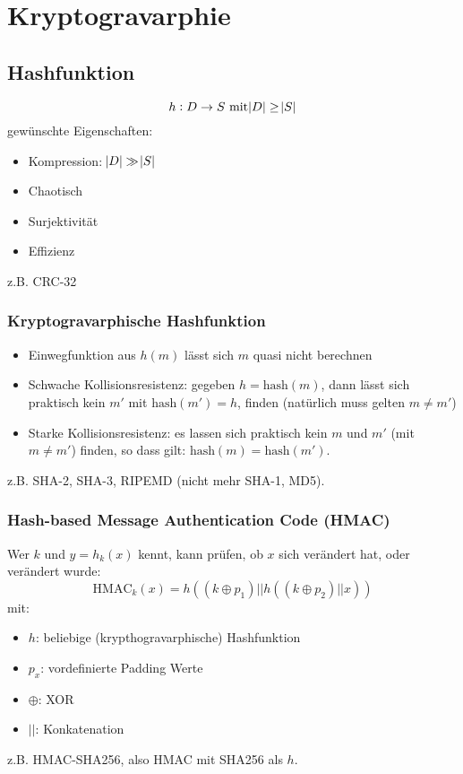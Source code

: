 \chapter{Kryptogravarphie}
\section{Hashfunktion}
\begin{equation*}
    h: D \to S \text{ mit} \abs{D} \geq \abs{S}
\end{equation*}
gewünschte Eigenschaften:
\begin{itemize}
    \item Kompression: $\abs{D} \gg \abs{S}$
    \item Chaotisch
    \item Surjektivität
    \item Effizienz
\end{itemize}
z.B. CRC-32

\subsection{Kryptogravarphische Hashfunktion}
\begin{itemize}
    \item Einwegfunktion aus $h(m)$ lässt sich $m$ quasi nicht berechnen
    \item Schwache Kollisionsresistenz: gegeben $h = \text{hash}(m)$, 
        dann lässt sich praktisch kein $m'$ mit $\text{hash}(m') = h$,
        finden (natürlich muss gelten $m \neq m'$)
    \item Starke Kollisionsresistenz: es lassen sich praktisch kein
        $m$ und $m'$ (mit $m \neq m'$) finden, so dass gilt:
        $\text{hash}(m) = \text{hash}(m')$.
\end{itemize}
z.B. SHA-2, SHA-3, RIPEMD (nicht mehr SHA-1, MD5).

\subsection{Hash-based Message Authentication Code (HMAC)}
Wer $k$ und $y = h_k(x)$ kennt, kann prüfen, ob $x$ sich verändert hat, oder verändert wurde:
\begin{equation*}
    {\text{HMAC}}_k(x) = h\left( (k \oplus p_1) || h\left((k \oplus p_2) || x\right)\right)
\end{equation*}
mit:
\begin{itemize}
    \item $h$: beliebige (krypthogravarphische) Hashfunktion
    \item $p_x$: vordefinierte Padding Werte
    \item $\oplus$: XOR
    \item $||$: Konkatenation
\end{itemize}
z.B. HMAC-SHA256, also HMAC mit SHA256 als $h$.

